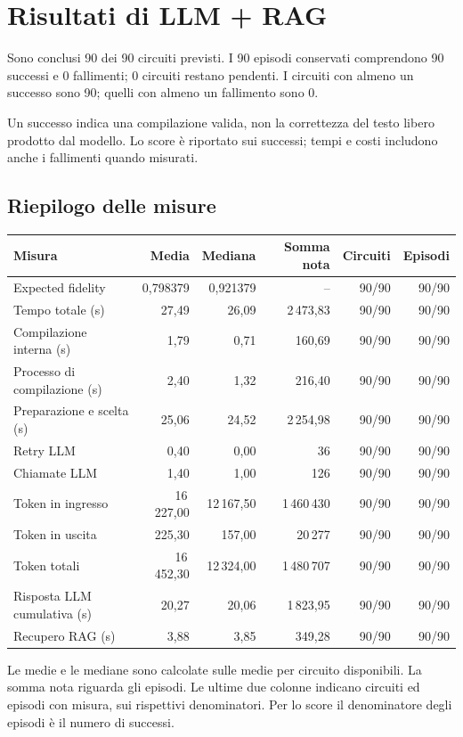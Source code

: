 \providecommand{\TestReportPath}{../}
\section{Risultati di LLM + RAG}
Sono conclusi 90 dei 90 circuiti previsti. I 90 episodi conservati comprendono 90 successi e 0 fallimenti; 0 circuiti restano pendenti. I circuiti con almeno un successo sono 90; quelli con almeno un fallimento sono 0.

Un successo indica una compilazione valida, non la correttezza del testo libero prodotto dal modello. Lo score è riportato sui successi; tempi e costi includono anche i fallimenti quando misurati.

\subsection{Riepilogo delle misure}
\begingroup\footnotesize
\setlength{\tabcolsep}{5pt}
\begin{center}
\begin{tabular}{lrrrrr}
\toprule
Misura & Media & Mediana & Somma nota & Circuiti & Episodi \\
\midrule
Expected fidelity & 0,798379 & 0,921379 & -- & 90/90 & 90/90 \\
Tempo totale (s) & 27,49 & 26,09 & 2\,473,83 & 90/90 & 90/90 \\
Compilazione interna (s) & 1,79 & 0,71 & 160,69 & 90/90 & 90/90 \\
Processo di compilazione (s) & 2,40 & 1,32 & 216,40 & 90/90 & 90/90 \\
Preparazione e scelta (s) & 25,06 & 24,52 & 2\,254,98 & 90/90 & 90/90 \\
Retry LLM & 0,40 & 0,00 & 36 & 90/90 & 90/90 \\
Chiamate LLM & 1,40 & 1,00 & 126 & 90/90 & 90/90 \\
Token in ingresso & 16\,227,00 & 12\,167,50 & 1\,460\,430 & 90/90 & 90/90 \\
Token in uscita & 225,30 & 157,00 & 20\,277 & 90/90 & 90/90 \\
Token totali & 16\,452,30 & 12\,324,00 & 1\,480\,707 & 90/90 & 90/90 \\
Risposta LLM cumulativa (s) & 20,27 & 20,06 & 1\,823,95 & 90/90 & 90/90 \\
Recupero RAG (s) & 3,88 & 3,85 & 349,28 & 90/90 & 90/90 \\
\bottomrule
\end{tabular}
\end{center}
\endgroup
Le medie e le mediane sono calcolate sulle medie per circuito disponibili. La somma nota riguarda gli episodi. Le ultime due colonne indicano circuiti ed episodi con misura, sui rispettivi denominatori. Per lo score il denominatore degli episodi è il numero di successi.

